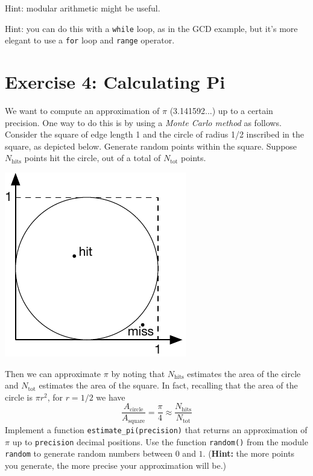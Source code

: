 \documentclass{article}
\begin{document}
\vspace{0.1in}\noindent Hint: modular arithmetic might be useful.

\vspace{0.1in}\noindent Hint: you can do this with a \texttt{while} loop, as in the GCD example, but it's
more elegant to use a \texttt{for} loop and \texttt{range} operator.

\section*{Exercise 4: Calculating Pi}

We want to compute an approximation of $\pi$ (3.141592...) up to a
 certain precision. One way to do this is by using a \emph{Monte Carlo
 method} as follows. Consider the square of edge length 1 and the
 circle of radius 1/2 inscribed in the square, as depicted
 below. Generate random points within the square. Suppose
 $N_{\text{hits}}$ points hit the circle, out of a total of
 $N_{\text{tot}}$ points.


\begin{center}
\includegraphics{ex1}
\end{center}

Then we can approximate $\pi$ by noting that $N_{\text{hits}}$
 estimates the area of the circle and $N_{\text{tot}}$ estimates the
 area of the square. In fact, recalling that the area of the circle is
 $\pi r^2$, for $r=1/2$ we have
\[
	\frac{A_{\text{circle}}}{A_{\text{square}}} = \frac{\pi}{4} \approx \frac{N_{\text{hits}}}{N_{\text{tot}}}
\]
%
Implement a function \texttt{estimate\_pi(precision)} that returns an
 approximation of $\pi$ up to \texttt{precision} decimal
 positions. Use the function \texttt{random()} from the module
 \texttt{random} to generate random numbers between $0$ and
 $1$. (\textbf{Hint:} the more points you generate, the more precise
 your approximation will be.)
\end{document}
